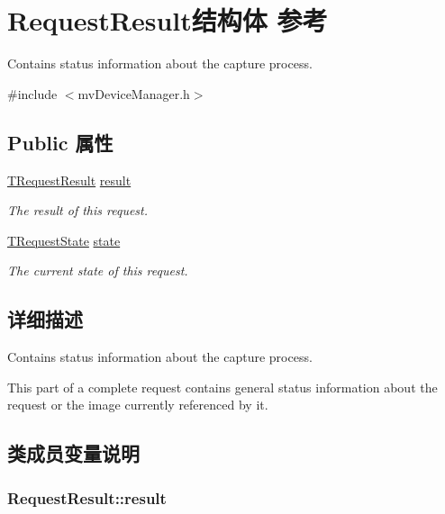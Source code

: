 \hypertarget{struct_request_result}{\section{Request\+Result结构体 参考}
\label{struct_request_result}
}


Contains status information about the capture process.  




{\ttfamily \#include $<$mv\+Device\+Manager.\+h$>$}

\subsection*{Public 属性}
\begin{DoxyCompactItemize}
\item 
\hyperlink{group___common_interface_gab6148762ea638f8eabbabfc9468b0d4c}{T\+Request\+Result} \hyperlink{struct_request_result_ab83a12ae3a933add3b4c699c4eeb0c8c}{result}
\begin{DoxyCompactList}\small\item\em The result of this request. \end{DoxyCompactList}\item 
\hyperlink{group___common_interface_gacaa15d9102d56c38e659c31c678a640d}{T\+Request\+State} \hyperlink{struct_request_result_a4dd2118f067f90283440567f2319cf90}{state}
\begin{DoxyCompactList}\small\item\em The current state of this request. \end{DoxyCompactList}\end{DoxyCompactItemize}


\subsection{详细描述}
Contains status information about the capture process. 

This part of a complete request contains general status information about the request or the image currently referenced by it. 

\subsection{类成员变量说明}
\hypertarget{struct_request_result_ab83a12ae3a933add3b4c699c4eeb0c8c}{
\subsubsection[{result}]{ Request\+Result\+::result}}\label{struct_request_result_ab83a12ae3a933add3b4c699c4eeb0c8c}


